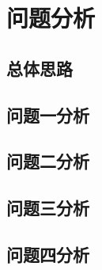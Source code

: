\section{问题分析}

\subsection{总体思路}

\subsection{问题一分析}
\subsection{问题二分析}
\subsection{问题三分析}
\subsection{问题四分析}
